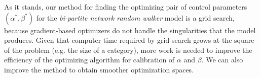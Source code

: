 As it stands, our method for finding the optimizing pair of control parameters $(\alpha^*,\beta^*)$ for the {\it bi-partite network random walker} model is a grid search, because gradient-based optimizers do not handle the singularities that the model produces. Given that computer time required by grid-search grows at the square of the problem (e.g. the size of a category), more work is needed to improve the efficiency of the optimizing algorithm for calibration of $\alpha$ and $\beta$. We can also improve the method to obtain smoother optimization spaces.



